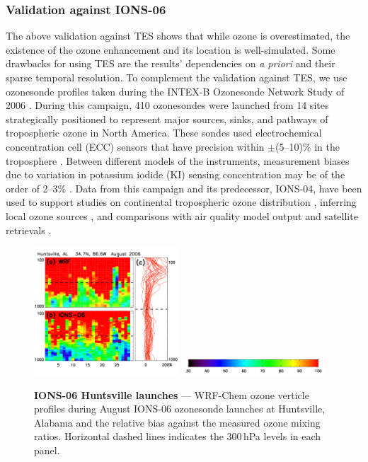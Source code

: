 \subsubsection{Validation against IONS-06}

The above validation against TES shows that while ozone is overestimated, the existence of the ozone enhancement and its location is well-simulated.
Some drawbacks for using TES are the results' dependencies on {\it a priori} and their sparse temporal resolution. To complement the validation against TES,
we use ozonesonde profiles taken during the INTEX-B Ozonesonde Network Study of 2006 \citep[IONS-06;][]{Thompson:2008rp}. During this campaign,
410 ozonesondes were launched from 14 sites strategically positioned to represent major sources, sinks, and pathways of tropospheric ozone in North
America. These sondes used electrochemical concentration cell (ECC) sensors that have precision within $\pm$(5--10)\% in the troposphere
\citep{Smit:2007ta}. Between different models of the instruments, measurement biases due to variation in potassium iodide (KI) sensing concentration may be of the
order of 2--3\% \citep{Smit:2007ta}. Data from this campaign and its predecessor, IONS-04, have been used to support studies on continental tropospheric
ozone distribution \citep{Cooper:2007cr}, inferring local ozone sources \citep{Thompson:2008rp}, and comparisons with air quality model output
\citep{Tarasick:2007dq} and satellite retrievals \citep{Nassar:2008mw}.

	\begin{figure}
		\centering
		\begin{singlespacing}
		\vspace{-.35in}
		\includegraphics[width=0.48\textwidth]{o3/ions_huntsville}
		\includegraphics[width=0.48\textwidth]{o3/o3_colorbar}
		\caption[IONS-06 Huntsville launches]{\small\textbf{IONS-06 Huntsville launches} --- WRF-Chem ozone verticle profiles during August IONS-06
		ozonesonde launches at Huntsville, Alabama and the relative bias against the measured ozone mixing ratios. Horizontal dashed lines indicates
		the 300\,\unit{hPa} levels in each panel.\vspace{-.2in}}
		\label{fig:2006/ions-hunts}
		\end{singlespacing}
	\end{figure}

